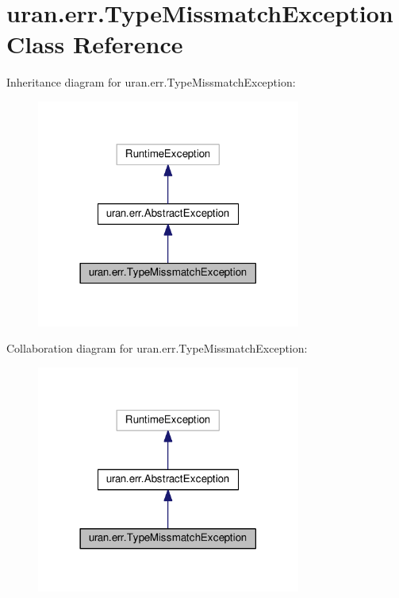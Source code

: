 \hypertarget{classuran_1_1err_1_1_type_missmatch_exception}{}\section{uran.\+err.\+Type\+Missmatch\+Exception Class Reference}
\label{classuran_1_1err_1_1_type_missmatch_exception}


Inheritance diagram for uran.\+err.\+Type\+Missmatch\+Exception\+:
\nopagebreak
\begin{figure}[H]
\begin{center}
\leavevmode
\includegraphics[width=246pt]{classuran_1_1err_1_1_type_missmatch_exception__inherit__graph}
\end{center}
\end{figure}


Collaboration diagram for uran.\+err.\+Type\+Missmatch\+Exception\+:
\nopagebreak
\begin{figure}[H]
\begin{center}
\leavevmode
\includegraphics[width=246pt]{classuran_1_1err_1_1_type_missmatch_exception__coll__graph}
\end{center}
\end{figure}
